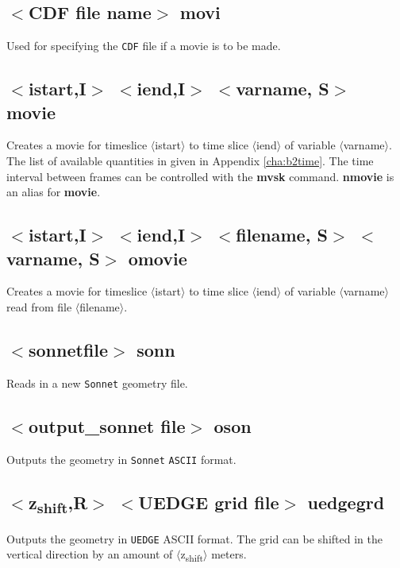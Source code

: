 \documentclass[a4paper,10pt]{report}
\begin{document}
\subsection{$<$CDF file name$>$ movi}\label{sec:movi}
Used for specifying the {\tt CDF} file if a movie is to be made.

\subsection{$<$istart,{\bf I}$>$ $<$iend,{\bf I}$>$ $<$varname, {\bf S}$>$ movie}\label{sec:movie}
Creates a movie for timeslice $\langle$istart$\rangle$ to time slice $\langle$iend$\rangle$ of variable $\langle$varname$\rangle$. The
list of available quantities in given in Appendix \ref{cha:b2time}. The time interval between frames can be
controlled with the {\bf mvsk} command.
{\bf nmovie} is an alias for {\bf movie}.

\subsection{$<$istart,{\bf I}$>$ $<$iend,{\bf I}$>$ $<$filename, {\bf S}$>$ $<$varname, {\bf S}$>$ omovie}\label{sec:omovie}
Creates a movie for timeslice $\langle$istart$\rangle$ to time slice $\langle$iend$\rangle$ of variable $\langle$varname$\rangle$ read
from file $\langle$filename$\rangle$.

\subsection{$<$sonnetfile$>$ sonn}\label{sec:sonn}
Reads in a new {\tt Sonnet} geometry file.

\subsection{$<$output\_sonnet file$>$ oson}\label{sec:oson}
Outputs the geometry in {\tt Sonnet} {\tt ASCII} format.

\subsection{$<$z\textsubscript{shift},{\bf R}$>$ $<$UEDGE grid file$>$ uedgegrd}\label{sec:uedgegrd}
Outputs the geometry in {\tt UEDGE} ASCII format. The grid can be shifted in the vertical
direction by an amount of $\langle$z\textsubscript{shift}$\rangle$ meters.
\end{document}

